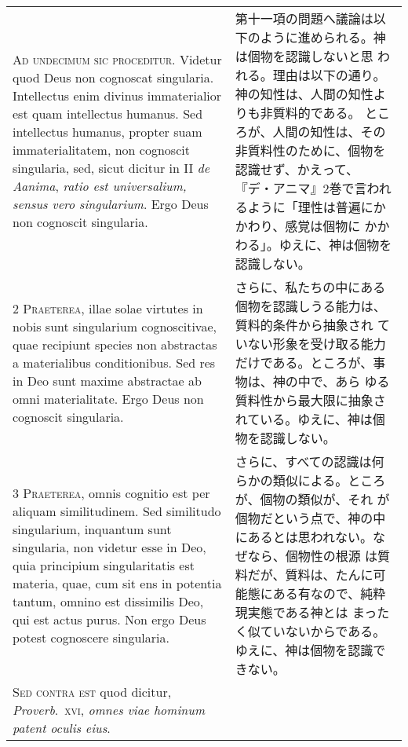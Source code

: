 \documentclass[10pt]{jsarticle} %
\begin{document}
\begin{longtable}{p{21em}p{21em}}



{\huge A}{\scshape d undecimum sic proceditur}. Videtur quod Deus non
cognoscat singularia. Intellectus enim divinus immaterialior est quam
intellectus humanus. Sed intellectus humanus, propter suam
immaterialitatem, non cognoscit singularia, sed, sicut dicitur in II
{\itshape de Aanima}, {\itshape ratio est universalium, sensus vero
singularium}. Ergo Deus non cognoscit singularia.


&

第十一項の問題へ議論は以下のように進められる。神は個物を認識しないと思
われる。理由は以下の通り。神の知性は、人間の知性よりも非質料的である。
ところが、人間の知性は、その非質料性のために、個物を認識せず、かえって、
『デ・アニマ』2巻で言われるように「理性は普遍にかかわり、感覚は個物に
かかわる」。ゆえに、神は個物を認識しない。

\\


{\scshape 2 Praeterea}, illae solae virtutes in nobis
sunt singularium cognoscitivae, quae recipiunt species non abstractas a
materialibus conditionibus. Sed res in Deo sunt maxime abstractae ab
omni materialitate. Ergo Deus non cognoscit singularia.


&

さらに、私たちの中にある個物を認識しうる能力は、質料的条件から抽象され
ていない形象を受け取る能力だけである。ところが、事物は、神の中で、あら
ゆる質料性から最大限に抽象されている。ゆえに、神は個物を認識しない。

\\


{\scshape 3 Praeterea}, omnis cognitio est per aliquam
similitudinem. Sed similitudo singularium, inquantum sunt singularia,
non videtur esse in Deo, quia principium singularitatis est materia,
quae, cum sit ens in potentia tantum, omnino est dissimilis Deo, qui est
actus purus. Non ergo Deus potest cognoscere singularia.


&

さらに、すべての認識は何らかの類似による。ところが、個物の類似が、それ
が個物だという点で、神の中にあるとは思われない。なぜなら、個物性の根源
は質料だが、質料は、たんに可能態にある有なので、純粋現実態である神とは
まったく似ていないからである。ゆえに、神は個物を認識できない。

\\


{\scshape Sed contra est} quod dicitur, {\itshape Proverb}.~{\scshape xvi},
{\itshape omnes viae hominum patent oculis eius}.


\end{longtable}
\end{document}
